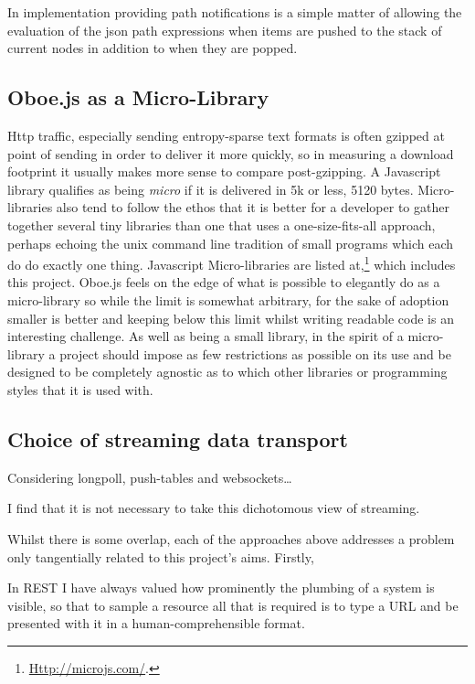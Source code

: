 \documentclass[]{article}
\begin{document}
In implementation providing path notifications is a simple matter of
allowing the evaluation of the json path expressions when items are
pushed to the stack of current nodes in addition to when they are
popped.

\subsection{Oboe.js as a Micro-Library}

Http traffic, especially sending entropy-sparse text formats is often
gzipped at point of sending in order to deliver it more quickly, so in
measuring a download footprint it usually makes more sense to compare
post-gzipping. A Javascript library qualifies as being \emph{micro} if
it is delivered in 5k or less, 5120 bytes. Micro-libraries also tend to
follow the ethos that it is better for a developer to gather together
several tiny libraries than one that uses a one-size-fits-all approach,
perhaps echoing the unix command line tradition of small programs which
each do do exactly one thing. Javascript Micro-libraries are listed
at,\footnote{\href{http://microjs.com/}{Http://microjs.com/}.} which
includes this project. Oboe.js feels on the edge of what is possible to
elegantly do as a micro-library so while the limit is somewhat
arbitrary, for the sake of adoption smaller is better and keeping below
this limit whilst writing readable code is an interesting challenge. As
well as being a small library, in the spirit of a micro-library a
project should impose as few restrictions as possible on its use and be
designed to be completely agnostic as to which other libraries or
programming styles that it is used with.

\subsection{Choice of streaming data transport}

Considering longpoll, push-tables and websockets\ldots{}

I find that it is not necessary to take this dichotomous view of
streaming.

Whilst there is some overlap, each of the approaches above addresses a
problem only tangentially related to this project's aims. Firstly,

In REST I have always valued how prominently the plumbing of a system is
visible, so that to sample a resource all that is required is to type a
URL and be presented with it in a human-comprehensible format.
\end{document}
